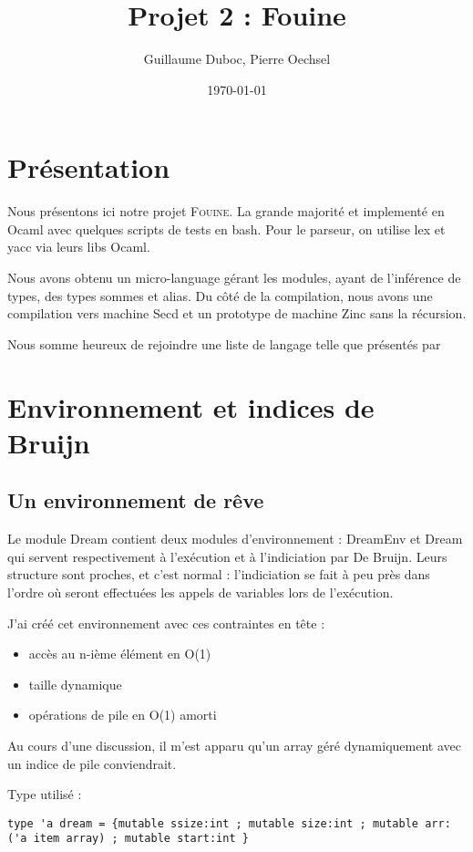 \documentclass[paper=a4, fontsize=11pt, twocolumn]{article}
\title{Projet 2 : Fouine}
\author{Guillaume Duboc, Pierre Oechsel}
\date{\today}
\begin{document}
\maketitle


\section{Présentation}
Nous présentons ici notre projet \textsc{Fouine}. La grande majorité et implementé en Ocaml avec quelques scripts de tests en bash.
Pour le parseur, on utilise lex et yacc via leurs libs Ocaml.

Nous avons obtenu un micro-language gérant les modules, ayant de l'inférence de types, des types sommes et alias. Du côté de la compilation, nous avons une compilation vers machine Secd et un prototype de machine Zinc sans la récursion.


Nous somme heureux de rejoindre une liste de langage telle que présentés par \cite{Landin}


\section{Environnement et indices de Bruijn}
\subsection{Un environnement de rêve}

Le module Dream contient deux modules d'environnement : DreamEnv et Dream qui servent respectivement à l'exécution et à l'indiciation par De Bruijn. Leurs structure sont proches, et c'est normal : l'indiciation se fait à peu près dans l'ordre où seront effectuées les appels de variables lors de l'exécution.

J'ai créé cet environnement avec ces contraintes en tête :
\begin{itemize}
	\item accès au n-ième élément en O(1) 
	\item taille dynamique
	\item opérations de pile en O(1) amorti
\end{itemize}

Au cours d'une discussion, il m'est apparu qu'un array géré dynamiquement avec un indice de pile conviendrait.

Type utilisé :
\begin{verbatim}
type 'a dream = {mutable ssize:int ; mutable size:int ; mutable arr:('a item array) ; mutable start:int }
\end{verbatim}
\end{document}
